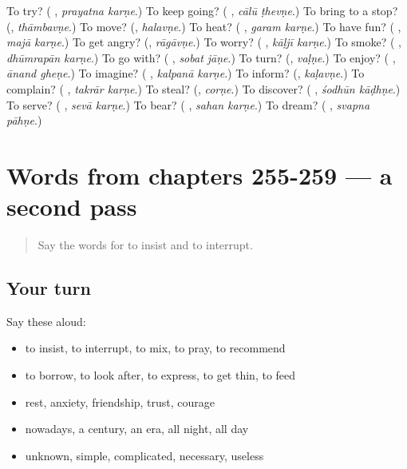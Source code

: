 \begin{tcolorbox}[breakable,colback=teal!4,colframe=teal!35!black,title={Before you move on}]
To try? (\textbf{ }, \emph{prayatna karṇe}.) To keep going? (\textbf{ }, \emph{cālū ṭhevṇe}.) To bring to a stop? (\textbf{}, \emph{thāmbavṇe}.) To move? (\textbf{}, \emph{halavṇe}.) To heat? (\textbf{ }, \emph{garam karṇe}.) To have fun? (\textbf{ }, \emph{majā karṇe}.) To get angry? (\textbf{}, \emph{rāgāvṇe}.) To worry? (\textbf{ }, \emph{kāḷjī karṇe}.) To smoke? (\textbf{ }, \emph{dhūmrapān karṇe}.) To go with? (\textbf{ }, \emph{sobat jāṇe}.) To turn? (\textbf{}, \emph{vaḷṇe}.) To enjoy? (\textbf{ }, \emph{ānand gheṇe}.) To imagine? (\textbf{ }, \emph{kalpanā karṇe}.) To inform? (\textbf{}, \emph{kaḷavṇe}.) To complain? (\textbf{ }, \emph{takrār karṇe}.) To steal? (\textbf{}, \emph{corṇe}.) To discover? (\textbf{ }, \emph{śodhūn kāḍhṇe}.) To serve? (\textbf{ }, \emph{sevā karṇe}.) To bear? (\textbf{ }, \emph{sahan karṇe}.) To dream? (\textbf{ }, \emph{svapna pāhṇe}.)
\end{tcolorbox}
\section[(dialogue)]{Words from chapters 255-259 — a second pass}

\label{lesson:MR-R259-second-pass-words-from-chapters-255-259}



\begin{quote}
Say the words for to insist and to interrupt.
\end{quote}

\subsection*{Your turn}
Say these aloud:

\begin{itemize}
\raggedright
  \item to insist, to interrupt, to mix, to pray, to recommend
  \item to borrow, to look after, to express, to get thin, to feed
  \item rest, anxiety, friendship, trust, courage
  \item nowadays, a century, an era, all night, all day
  \item unknown, simple, complicated, necessary, useless
\end{itemize}

